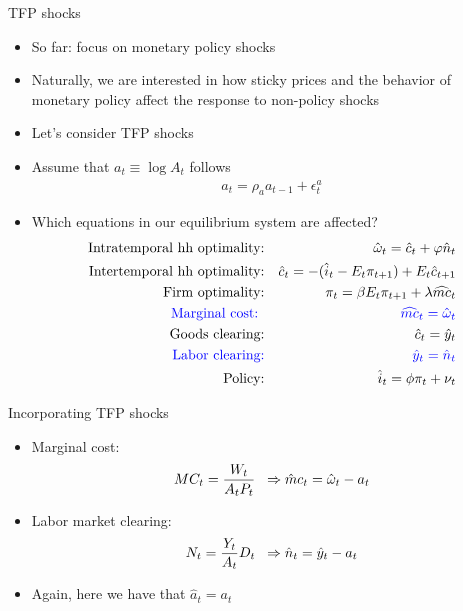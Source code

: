 \documentclass[9pt,xcolor={dvipsnames}]{beamer}
\newcommand{\bit}{\begin{itemize}}
\newcommand{\eit}{\end{itemize}}
\newcommand{\bc}{\color{blue}}
\begin{document}
\begin{frame}{TFP shocks}

\bit
\setlength\itemsep{1em}
\item So far: focus on monetary policy shocks

\item Naturally, we are interested in how sticky prices and the behavior of monetary policy affect the response to non-policy shocks

\item Let's consider TFP shocks

\item Assume that $a_t \equiv \log A_t$ follows
\begin{eqnarray}
a_t = \rho_a a_{t-1} + \epsilon^a_t \nonumber
\end{eqnarray}

\item Which equations in our equilibrium system are affected?
\begin{eqnarray}
\text{Intratemporal hh optimality:} && \hat \omega_t = \hat c_t + \varphi \hat n_t  \nonumber \\
\text{Intertemporal hh optimality:} && \hat c_t =  - (\hat i_t - E_t \pi_{t+1} ) + E_t \hat c_{t+1}  \nonumber \\
\text{Firm optimality:} && \pi_t = \beta E_t \pi_{t+1} + \lambda \widehat{mc}_t \nonumber \\
\text{{\bc Marginal cost:} } && {\bc \widehat{mc}_t = \hat \omega_t}  \nonumber \\
\text{Goods clearing:} && \hat c_t = \hat y_t \nonumber \\
\text{{\bc Labor clearing:}} && {\bc \hat y_t = \hat n_t} \nonumber \\
\text{Policy:} && \hat i_t = \phi \pi_t + \nu_t \nonumber 
\end{eqnarray}

\eit


\end{frame}


\begin{frame}{Incorporating TFP shocks}

\bit
\setlength\itemsep{2em}

\item Marginal cost:
\begin{eqnarray}
MC_t = \frac{W_{t}}{A_tP_t} \hspace{2mm} \Rightarrow \hat mc_t = \hat \omega_t - a_t \nonumber
\end{eqnarray}

\item Labor market clearing:
\begin{eqnarray}
N_t = \frac{Y_{t}}{A_t} D_t \hspace{2mm} \Rightarrow \hat n_t = \hat y_t - a_t \nonumber
\end{eqnarray}

\item Again, here we have that $\hat a_t = a_t$

\eit

\end{frame}
\end{document}
